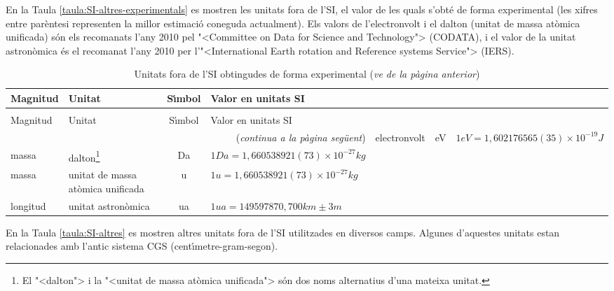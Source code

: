 En la Taula \vref{taula:SI-altres-experimentals} es mostren les unitats fora de l'SI, el valor de les quals s'obt\'{e} de forma experimental (les xifres entre par\`{e}ntesi representen la millor estimaci\'{o} coneguda actualment). Els valors de l'electronvolt i el dalton (unitat de massa at\`{o}mica unificada) s\'{o}n els recomanats
l'any 2010 pel {"<}Committee on Data for Science and Technology{">} (\textsf{CODATA}), i el valor de la unitat astron\`{o}mica \'{e}s el recomanat l'any 2010 per l'{"<}International Earth rotation and Reference systems Service{">} (\textsf{IERS}).

\begin{longtable}[h]{llcl}
   \caption{\label{taula:SI-altres-experimentals} Unitats fora de l'SI obtingudes de forma experimental }\\
   \toprule[1pt]
    Magnitud & Unitat &  S\'{\i}mbol & Valor en unitats SI\\
   \midrule
   \endfirsthead
   \caption[]{Unitats fora de l'SI obtingudes de forma experimental (\emph{ve de la p\`{a}gina
   anterior})}\\
   \toprule[1pt]
    Magnitud & Unitat &  S\'{\i}mbol & Valor en unitats SI\\
   \midrule
   \endhead
   \midrule
   \multicolumn{4}{r}{(\emph{continua a la p\`{a}gina seg\"{u}ent})}
   \endfoot
   \endlastfoot
   energia & electronvolt & \unit{eV} & $1\unit{eV} = 1{,}602176565(35)\times 10^{-19}\unit{J}$ \\
   massa & dalton\footnote{El {"<}dalton{">} i la {"<}unitat de massa at\`{o}mica unificada{">} s\'{o}n dos noms alternatius d'una mateixa unitat.}& Da & $1\unit{Da} = 1{,}660538921(73)\times 10^{-27}\unit{kg}$\\
   massa & unitat de massa at\`{o}mica unificada\footnotemark[5] & u & $1\unit{u} =
    1{,}660538 921(73)\times 10^{-27}\unit{kg}$  \\
   longitud & unitat astron\`{o}mica &  \unit{ua }& $1\unit{ua} =  149597870{,}700\unit{km} \pm 3\unit{m}$ \\
\bottomrule[1pt]
\end{longtable}


En la Taula \vref{taula:SI-altres} es mostren altres unitats fora de l'SI utilitzades en diversos camps. Algunes d'aquestes unitats estan relacionades amb l'antic sistema CGS (cent\'{\i}metre-gram-segon).

